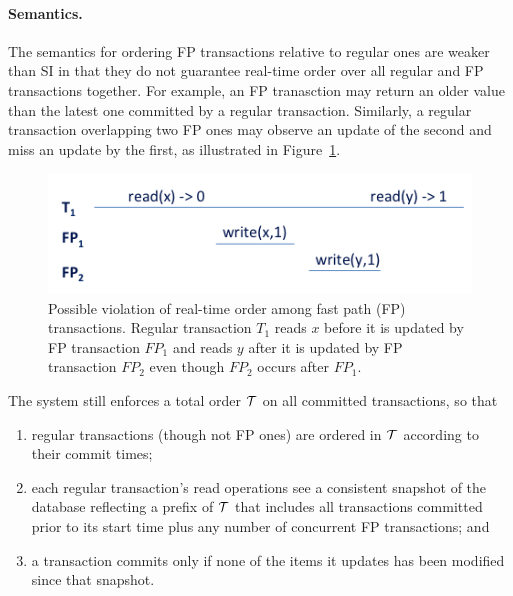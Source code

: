 \paragraph{Semantics.}

The semantics for ordering FP transactions relative to regular ones are
weaker than SI in that they do not guarantee real-time order over all regular
and FP transactions together. For example, an FP tranasction may return 
an older value than the latest one committed by a regular transaction. Similarly, a regular transaction overlapping
two FP ones may observe an update of the second and miss an update by the first,  as illustrated in Figure~\ref{fig:ltx-rt}.

\begin{figure}[h]
\includegraphics[width=\columnwidth]{figs/FP-semantics}
\caption{Possible violation of real-time order among fast path (FP) transactions. Regular transaction $T_1$
reads $x$ before it is updated by FP transaction $FP_1$ and reads $y$ after it is updated by FP transaction $FP_2$ even 
though $FP_2$ occurs after $FP_1$. 
}
\label{fig:ltx-rt}
\end{figure}

The system still enforces a total order ${\cal T}$ on all committed transactions, so that
\begin{enumerate}
    \setlength{\itemsep}{0pt}
    \setlength{\parskip}{0pt}
    \setlength{\parsep}{2pt}  
\item
regular transactions (though not FP ones) are ordered in ${\cal T}$  according to their commit times;
\item
each regular transaction's read operations see a consistent snapshot of the database reflecting 
a prefix of  ${\cal T}$ that includes all transactions committed prior to
its start time plus any number of concurrent FP transactions; and 
\item
 a transaction commits only if none of the items it updates has been modified since that snapshot.
 \end{enumerate}

